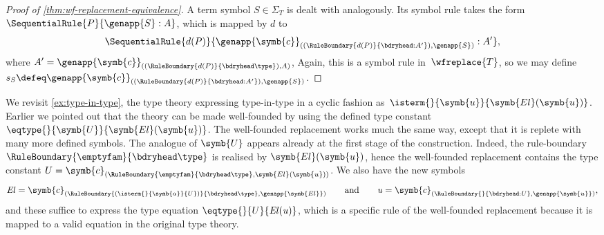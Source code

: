\begin{proof}[Proof of \cref{thm:wf-replacement-equivalence}]
  A term symbol $S \in \Sigma_T$ is dealt with analogously. Its symbol rule takes the form $\SequentialRule{P}{\genapp{S} : A}$, which is mapped by $d$ to
  \begin{equation*}
    \SequentialRule{d(P)}{\genapp{\symb{c}}_{((\RuleBoundary{d(P)}{\bdryhead : A'}), \genapp{S})} : A'},
  \end{equation*}
  where $A' = \genapp{\symb{c}}_{((\RuleBoundary{d(P)}{\bdryhead \type}), A)}$,
  Again, this is a symbol rule in~$\wfreplace{T}$, so we may define $s_S \defeq \genapp{\symb{c}}_{((\RuleBoundary{d(P)}{\bdryhead : A'}), \genapp{S})}$.
\end{proof}

\begin{example}
  We revisit \cref{ex:type-in-type}, the type theory expressing type-in-type in a cyclic fashion as~$\isterm{}{\symb{u}}{\symb{El}(\symb{u})}$.
  Earlier we pointed out that the theory can be made well-founded by using the defined type constant $\eqtype{}{\symb{U}}{\symb{El}(\symb{u})}$.
  The well-founded replacement works much the same way, except that it is replete with many more defined symbols. The analogue of $\symb{U}$ appears already at the first stage of the construction. Indeed, the rule-boundary $\RuleBoundary{\emptyfam}{\bdryhead \type}$ is realised by $\symb{El}(\symb{u})$, hence the well-founded replacement contains the type constant $U = \symb{c}_{(\RuleBoundary{\emptyfam}{\bdryhead \type}, \symb{El}(\symb{u}))}$.
  We also have the new symbols
  \begin{equation*}
    \mathit{El} = \symb{c}_{(\RuleBoundary{(\isterm{}{\symb{a}}{U})}{\bdryhead \type}, \genapp{\symb{El}})}
    \qquad\text{and}\qquad
    \mathit{u} = \symb{c}_{(\RuleBoundary{}{\bdryhead : U}, \genapp{\symb{u}})},
  \end{equation*}
  and these suffice to express the type equation $\eqtype{}{U}{\mathit{El}(\mathit{u})}$, which is a specific rule of the well-founded replacement because it is mapped to a valid equation in the original type theory.
\end{example}


